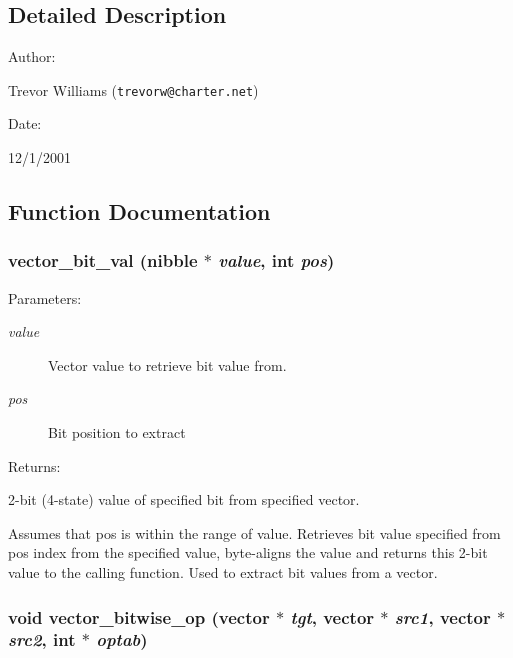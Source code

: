 \subsection{Detailed Description}


\begin{Desc}
\item[Author: ]\par
Trevor Williams ({\tt trevorw@charter.net}) \end{Desc}
\begin{Desc}
\item[Date: ]\par
12/1/2001\end{Desc}


\subsection{Function Documentation}
\subsubsection{ vector\_\-bit\_\-val ({\bf nibble} $\ast$ {\em value}, int {\em pos})}\label{vector_8c_a16}


\begin{Desc}
\item[Parameters: ]\par
\begin{description}
\item[{\em 
value}]Vector value to retrieve bit value from. \item[{\em 
pos}]Bit position to extract \end{description}
\end{Desc}
\begin{Desc}
\item[Returns: ]\par
2-bit (4-state) value of specified bit from specified vector.\end{Desc}
Assumes that pos is within the range of value. Retrieves bit value specified from pos index from the specified value, byte-aligns the value and returns this 2-bit value to the calling function. Used to extract bit values from a vector. 
\subsubsection{\setlength{\rightskip}{0pt plus 5cm}void vector\_\-bitwise\_\-op ({\bf vector} $\ast$ {\em tgt}, {\bf vector} $\ast$ {\em src1}, {\bf vector} $\ast$ {\em src2}, int $\ast$ {\em optab})}\label{vector_8c_a31}


